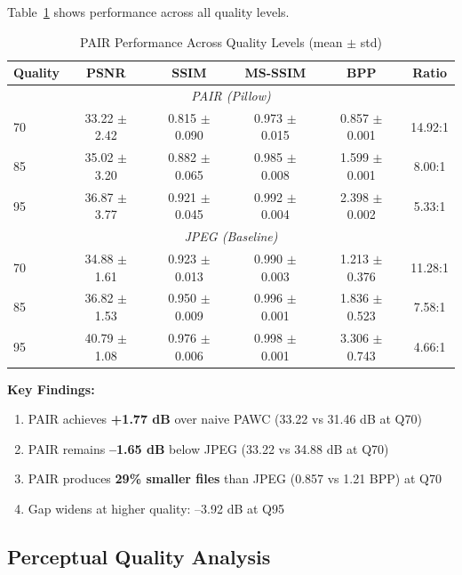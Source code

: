 \documentclass[conference]{IEEEtran}
\begin{document}
Table~\ref{tab:all_quality} shows performance across all quality levels.

\begin{table}[htbp]
\caption{PAIR Performance Across Quality Levels (mean $\pm$ std)}
\begin{center}
\small
\begin{tabular}{lccccc}
\toprule
\textbf{Quality} & \textbf{PSNR} & \textbf{SSIM} & \textbf{MS-SSIM} & \textbf{BPP} & \textbf{Ratio} \\
\midrule
\multicolumn{6}{c}{\textit{PAIR (Pillow)}} \\
\midrule
70 & 33.22 $\pm$ 2.42 & 0.815 $\pm$ 0.090 & 0.973 $\pm$ 0.015 & 0.857 $\pm$ 0.001 & 14.92:1 \\
85 & 35.02 $\pm$ 3.20 & 0.882 $\pm$ 0.065 & 0.985 $\pm$ 0.008 & 1.599 $\pm$ 0.001 & 8.00:1 \\
95 & 36.87 $\pm$ 3.77 & 0.921 $\pm$ 0.045 & 0.992 $\pm$ 0.004 & 2.398 $\pm$ 0.002 & 5.33:1 \\
\midrule
\multicolumn{6}{c}{\textit{JPEG (Baseline)}} \\
\midrule
70 & 34.88 $\pm$ 1.61 & 0.923 $\pm$ 0.013 & 0.990 $\pm$ 0.003 & 1.213 $\pm$ 0.376 & 11.28:1 \\
85 & 36.82 $\pm$ 1.53 & 0.950 $\pm$ 0.009 & 0.996 $\pm$ 0.001 & 1.836 $\pm$ 0.523 & 7.58:1 \\
95 & 40.79 $\pm$ 1.08 & 0.976 $\pm$ 0.006 & 0.998 $\pm$ 0.001 & 3.306 $\pm$ 0.743 & 4.66:1 \\
\bottomrule
\end{tabular}
\label{tab:all_quality}
\end{center}
\end{table}

\textbf{Key Findings:}
\begin{enumerate}
    \item PAIR achieves \textbf{+1.77 dB} over naive PAWC (33.22 vs 31.46 dB at Q70)
    \item PAIR remains \textbf{--1.65 dB} below JPEG (33.22 vs 34.88 dB at Q70)
    \item PAIR produces \textbf{29\% smaller files} than JPEG (0.857 vs 1.21 BPP) at Q70
    \item Gap widens at higher quality: --3.92 dB at Q95
\end{enumerate}

\subsection{Perceptual Quality Analysis}
\end{document}
